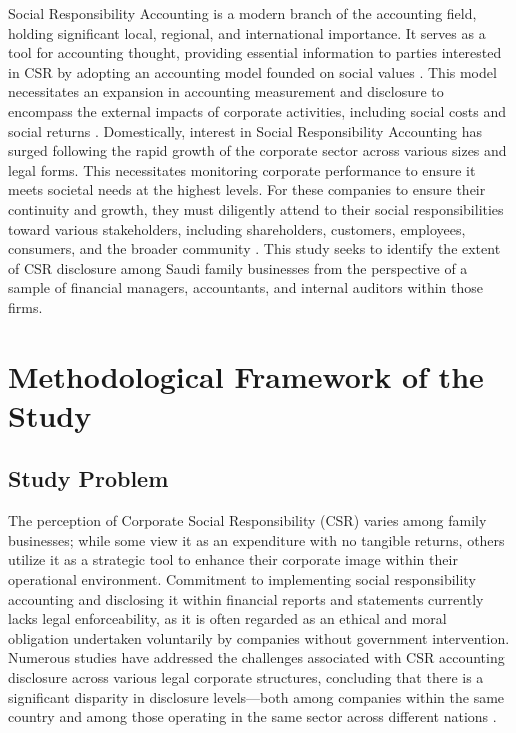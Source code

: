 \documentclass{NSP1}
\begin{document}
Social Responsibility Accounting is a modern branch of the accounting field, holding significant local, regional, and international importance. It serves as a tool for accounting thought, providing essential information to parties interested in CSR by adopting an accounting model founded on social values \cite{ref3}. This model necessitates an expansion in accounting measurement and disclosure to encompass the external impacts of corporate activities, including social costs and social returns \cite{ref4}. Domestically, interest in Social Responsibility Accounting has surged following the rapid growth of the corporate sector across various sizes and legal forms. This necessitates monitoring corporate performance to ensure it meets societal needs at the highest levels. For these companies to ensure their continuity and growth, they must diligently attend to their social responsibilities toward various stakeholders, including shareholders, customers, employees, consumers, and the broader community \cite{ref5}. This study seeks to identify the extent of CSR disclosure among Saudi family businesses from the perspective of a sample of financial managers, accountants, and internal auditors within those firms.

\section{Methodological Framework of the Study}
\subsection{Study Problem}
The perception of Corporate Social Responsibility (CSR) varies among family businesses; while some view it as an expenditure with no tangible returns, others utilize it as a strategic tool to enhance their corporate image within their operational environment. Commitment to implementing social responsibility accounting and disclosing it within financial reports and statements currently lacks legal enforceability, as it is often regarded as an ethical and moral obligation undertaken voluntarily by companies without government intervention. Numerous studies have addressed the challenges associated with CSR accounting disclosure across various legal corporate structures, concluding that there is a significant disparity in disclosure levels---both among companies within the same country and among those operating in the same sector across different nations \cite{ref37}.
\end{document}
